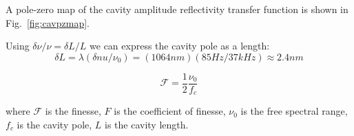 \label{chapter7}
\onehalfspace
{}
A pole-zero map of the cavity amplitude reflectivity transfer function is shown in Fig.~\ref{fig:cavpzmap}.

Using $\delta \nu / \nu = \delta L / L$ we can express the cavity pole
as a length:
\[
\delta L = \lambda \left(\delta nu / \nu_0\right) = (1064 nm)  (85 Hz / 37 kHz) \approx 2.4 nm 
\]

\begin{equation}
\mathcal{F} = \frac{1}{2} \frac{\nu_0}{f_c}
\end{equation}

where $\mathcal{F}$ is the finesse, $F$ is the coefficient of finesse, $\nu_0$ is the free spectral range, $f_c$ is the cavity pole, $L$ is the cavity length.

